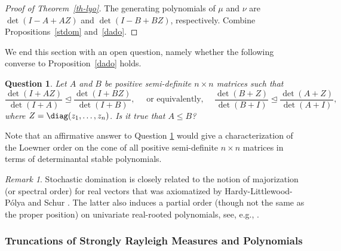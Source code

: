 \documentclass[10pt,reqno]{amsart}
\theoremstyle{plain}
\newtheorem{question}[problem]{Question}
\theoremstyle{definition}
\theoremstyle{remark}
\newtheorem{remark}{Remark}[section]
\newcommand{\RR}{\mathbb{R}}
\newcommand{\ben}{\mathbf{1}}
\begin{document}
\begin{proof}[Proof of Theorem~\ref{th-lyo}]
The generating polynomials of $\mu$ and $\nu$ are $\det(I-A+AZ)$ and 
$\det(I-B+BZ)$,  respectively. Combine Propositions~\ref{stdom} and~\ref{dado}.
\end{proof}

We end this section with an open question, namely whether the following
converse to Proposition~\ref{dado} holds. 

\begin{question}\label{q-pos-d}
Let $A$ and $B$ be positive semi-definite $n \times n$ matrices such that 
$$
\frac {\det(I+AZ)}{\det(I+A)} \unlhd \frac{\det(I+BZ)}{\det(I+B)},  
\quad \mbox{ or equivalently, } \quad 
\frac {\det(B+Z)}{\det(B+I)} \unlhd \frac{\det(A+Z)}{\det(A+I)},
$$
where $Z=\diag(z_1,\ldots,z_n)$. Is it true that $A\le B$?
\end{question}

Note that an affirmative answer to Question \ref{q-pos-d} would give a 
characterization of the Loewner order
on the cone of all positive semi-definite $n\times n$ matrices in terms
of determinantal stable polynomials.

\begin{remark}\label{r-spec}
Stochastic domination is closely related to the
notion of majorization (or spectral order) for real vectors 
that was axiomatized by Hardy-Littlewood-P\'olya 
and Schur \cite{HLP,MO}. The latter also induces a partial order (though not 
the same as the proper position) on univariate real-rooted polynomials, 
see, e.g., \cite{Bor}. 
\end{remark}

\subsubsection{Truncations of Strongly Rayleigh Measures and 
Polynomials}\label{sss-trunc}
\end{document}
